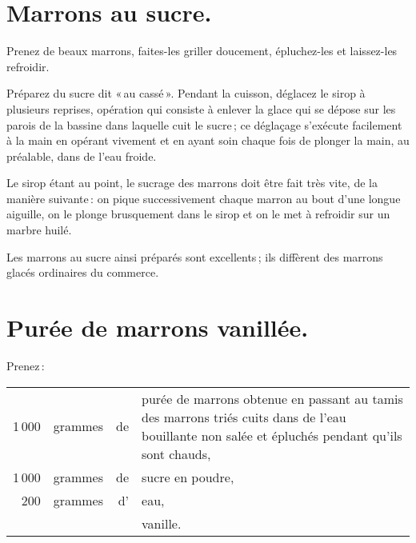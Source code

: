 \section*{\centering Marrons au sucre.}
{}

Prenez de beaux marrons, faites-les griller doucement, épluchez-les et
laissez-les refroidir.

Préparez du sucre dit « au cassé ». Pendant la cuisson, déglacez le sirop
à plusieurs reprises, opération qui consiste à enlever la glace qui se dépose
sur les parois de la bassine dans laquelle cuit le sucre ; ce déglaçage
s'exécute facilement à la main en opérant vivement et en ayant soin chaque fois
de plonger la main, au préalable, dans de l’eau froide.

Le sirop étant au point, le sucrage des marrons doit être fait très vite, de la
manière suivante : on pique successivement chaque marron au bout d'une longue
aiguille, on le plonge brusquement dans le sirop et on le met à refroidir sur un
marbre huilé.

Les marrons au sucre ainsi préparés sont excellents ; ils diffèrent des marrons
glacés ordinaires du commerce.

\label{pg0902} \hypertarget{p0902}{}
\section*{\centering Purée de marrons vanillée.}
{}

Prenez :

\footnotesize
\begin{longtable}{rrrp{16em}}
  1 000 & grammes & de & purée de marrons obtenue en passant au tamis des marrons
                         triés cuits dans de l'eau bouillante non salée et épluchés
                         pendant qu'ils sont chauds,                                                      \\
  1 000 & grammes & de & sucre en poudre,                                                                 \\
    200 & grammes & d' & eau,                                                                             \\
        &         &    & vanille.                                                                         \\
\end{longtable}
\normalsize

